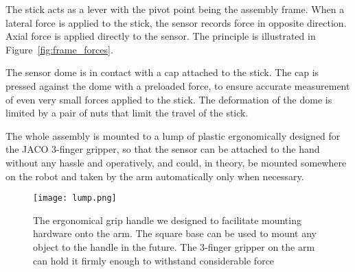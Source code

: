 \documentclass[buriama8_dp.tex]{subfiles}
\begin{document}
The stick acts as a lever with the pivot point being the assembly frame. When a lateral force is applied to the stick, the sensor records force in opposite direction. Axial force is applied directly to the sensor. The principle is illustrated in Figure~\ref{fig:frame_forces}.

The sensor dome is in contact with a cap attached to the stick. The cap is pressed against the dome with a preloaded force, to ensure accurate measurement of even very small forces applied to the stick. The deformation of the dome is limited by a pair of nuts that limit the travel of the stick.

The whole assembly is mounted to a lump of plastic ergonomically designed for the JACO 3-finger gripper, so that the sensor can be attached to the hand without any hassle and operatively, and could, in theory, be mounted somewhere on the robot and taken by the arm automatically only when necessary.

\begin{figure}[ht]
  \centering
  \texttt{[image: lump.png]}
  \caption{The ergonomical grip handle we designed to facilitate mounting hardware onto the arm. The square base can be used to mount any object to the handle in the future. The 3-finger gripper on the arm can hold it firmly enough to withstand considerable force}
  \label{fig:label}
\end{figure}
\end{document}
